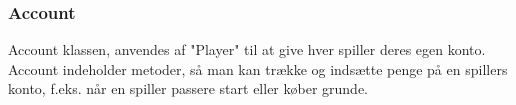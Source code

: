 \subsubsection{Account}
Account klassen, anvendes af "Player" til at give hver spiller deres egen konto. Account indeholder metoder, så man kan trække og indsætte penge på en spillers konto, f.eks. når en spiller passere start eller køber grunde.